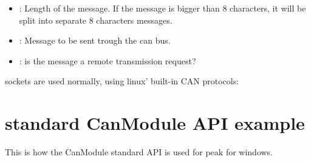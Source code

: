 \documentclass[letterpaper,10pt,english]{sphinxmanual}
\begin{document}
\begin{fulllineitems}
\begin{fulllineitems}
\begin{description}
\begin{itemize}
\item {} 
: Length of the message. If the message is bigger than 8 characters, it will be split into separate 8 characters messages. 

\item {} 
: Message to be sent trough the can bus. 

\item {} 
: is the message a remote transmission request? 

\end{itemize}

\end{description}


\end{fulllineitems}


\end{fulllineitems}


sockets are used normally, using linux’ built-in CAN protocols:

\begin{sphinxVerbatim}[commandchars=\\\{\}]
    
\end{sphinxVerbatim}


\section{standard CanModule API example}
\label{\detokenize{vendors/peak:standard-canmodule-api-example}}
This is how the CanModule standard API is used for peak for windows.

\begin{sphinxVerbatim}[commandchars=\\\{\}]
     
      
  
  
\end{sphinxVerbatim}
\end{document}
